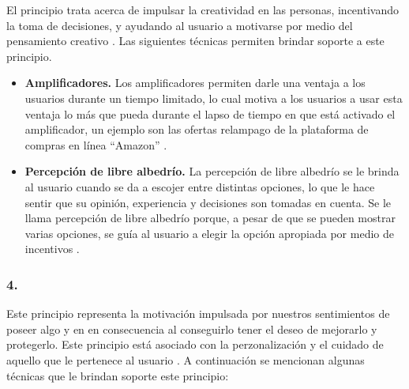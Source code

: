  El principio trata acerca de impulsar la creatividad en las personas, incentivando la toma de
 decisiones, y ayudando al usuario a motivarse por medio del pensamiento creativo \cite[p. 126]{Octalysis}.
 Las siguientes técnicas permiten brindar soporte a este principio.
    
    \begin{itemize}
    \item
    {\bf Amplificadores.}
        Los amplificadores permiten darle una ventaja a los usuarios durante un tiempo limitado,
        lo cual motiva a los usuarios a usar esta ventaja lo más que pueda durante el lapso de tiempo
        en que está activado el amplificador, un ejemplo son las ofertas relampago de la plataforma
        de compras en línea ``Amazon'' \cite[p. 146]{Octalysis}.

        
    \item
    {\bf Percepción de libre albedrío.}
        La percepción de libre albedrío se le brinda al usuario cuando se da a escojer entre distintas
        opciones, lo que le hace sentir que su opinión, experiencia y decisiones son tomadas en cuenta.
        Se le llama percepción de libre albedrío porque, a pesar de que se pueden mostrar varias opciones,
        se guía al usuario a elegir la opción apropiada por medio de incentivos \cite[p. 150]{Octalysis}.
    \end{itemize}
    
\subsubsection{4. \principioIV} \label{subsec:principioIV}
    
 Este principio representa la motivación impulsada por nuestros sentimientos de poseer algo y en
 en consecuencia al conseguirlo tener el deseo de mejorarlo y protegerlo. %
 Este principio está asociado con la perzonalización y el cuidado de aquello que le pertenece al usuario
 \cite[p. 161]{Octalysis}. A continuación se mencionan algunas técnicas que le brindan soporte este
 principio:
    

